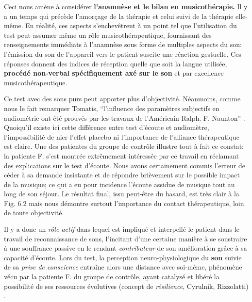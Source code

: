 \begin{itemize}
 
 Ceci nous amène à considérer \textbf{ l'anamnèse et le bilan en musicothérapie.}
 Il y a un temps qui
 précède
 l'amorçage de la thérapie et celui suivi de la thérapie elle-même.
 En réalité, ces aspects s'enchevêtrent à un point tel que
 l'utilisation du test peut assumer même un rôle musicothérapeutique, fournissant des
 renseignements immédiats à l'anamnèse sous forme de multiples
 aspects du son: l'émission du son de
 l'appareil vers le patient suscite une  réaction gestuelle.  Ces réponses  
 donnent des indices de réception %
 quelle que soit la langue utilisée,\textbf{ procédé non-verbal
 	spécifiquement axé sur le son} et par excellence musicothérapeutique. 
 
Ce test avec des sons purs peut apporter plus d'objectivité. Néanmoins, comme nous le fait remarquer 
Tomatis,
\enquote{l'influence des paramètres subjectifs en audiométrie ont été prouvés par les travaux de 
	l'Américain Ralph. F. Naunton}  \autocite [69]{tomatisoreilletvie}. Quoiqu'il existe ici cette différence 
entre 
test d'écoute et audiomètre,
l'impossibilité  de nier l'effet placebo ni l'importance de  
l'alliance 
thérapeutique est claire.
 Une des patientes du groupe de contrôle illustre tout à fait ce constat: la patiente F. 
s'est  montrée extrêmement intéressée par ce travail en réclamant des explications sur le test d'écoute. 
Nous avons certainement commis l'erreur de céder à sa demande insistante et de répondre brièvement 
sur le possible impact de la musique; ce qui a eu pour incidence l'écoute assidue de musique  tout au 
long de son séjour. Le résultat final, issu peut-être du hasard, est très clair à la Fig. 6.2 mais nous 
démontre 
surtout l'importance du contact thérapeutique, loin de toute objectivité.

 Il y a donc un  \emph{rôle actif} dans lequel est impliqué et interpellé le patient dans le travail
 de reconnaissance de sons, l'incitant d'une certaine manière  à se soustraire à une souffrance
 passive en  le rendant  \textit{contributeur} de son amélioration grâce à sa capacité
 d'écoute.
  Lors du test, la perception
 neuro-physiologique du \textbf{son} suivie de sa
 \textit{prise de conscience }
 entraîne alors une distance avec
 soi-même, phénomène vécu  par 
 la  patiente F.  du groupe de contrôle, ayant catalysé et libéré
 la possibilité de ses ressources évolutives (concept de \textit{résilience}, Cyrulnik, Rizzolatti) 
 \autocite[27--63]{van_eersel_cerveau}.
 

\end{itemize}
